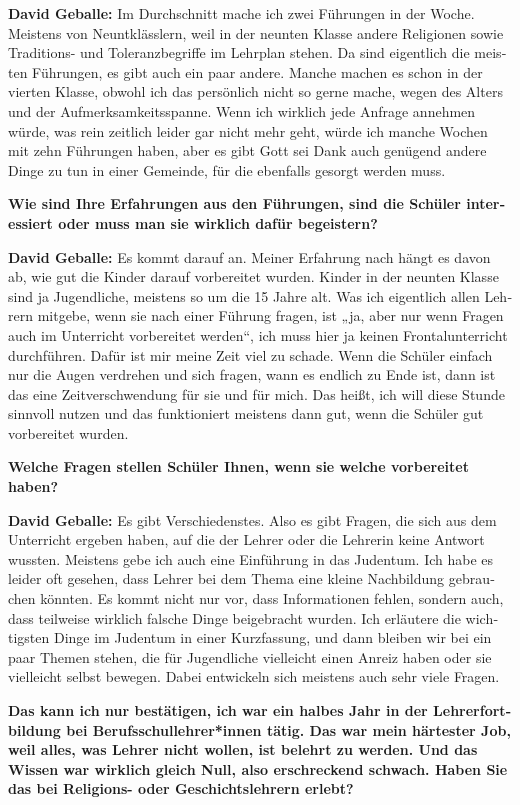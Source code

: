\begin{otherlanguage}{ngerman}
\textbf{David Geballe:} Im Durchschnitt mache ich zwei Führungen in der Woche. Meistens von Neuntklässlern, weil in der neunten Klasse andere Religionen sowie Traditions- und Toleranzbegriffe im Lehrplan stehen. Da sind eigentlich die meisten Führungen, es gibt auch ein paar andere. Manche machen es schon in der vierten Klasse, obwohl ich das persönlich nicht so gerne mache, wegen des Alters und der Aufmerksamkeitsspanne. Wenn ich wirklich jede Anfrage annehmen würde, was rein zeitlich leider gar nicht mehr geht, würde ich manche Wochen mit zehn Führungen haben, aber es gibt Gott sei Dank auch genügend andere Dinge zu tun in einer Gemeinde, für die ebenfalls gesorgt werden muss. 

\textbf{Wie sind Ihre Erfahrungen aus den Führungen, sind die Schüler interessiert oder muss man sie wirklich dafür begeistern?} 

\textbf{David Geballe:} Es kommt darauf an. Meiner Erfahrung nach hängt es davon ab, wie gut die Kinder darauf vorbereitet wurden. Kinder in der neunten Klasse sind ja Jugendliche, meistens so um die 15 Jahre alt. Was ich eigentlich allen Lehrern mitgebe, wenn sie nach einer Führung fragen, ist „ja, aber nur wenn Fragen auch im Unterricht vorbereitet werden“, ich muss hier ja keinen Frontalunterricht durchführen. Dafür ist mir meine Zeit viel zu schade. Wenn die Schüler einfach nur die Augen verdrehen und sich fragen, wann es endlich zu Ende ist, dann ist das eine Zeitverschwendung für sie und für mich. Das heißt, ich will diese Stunde sinnvoll nutzen und das funktioniert meistens dann gut, wenn die Schüler gut vorbereitet wurden. 

\textbf{Welche Fragen stellen Schüler Ihnen, wenn sie welche vorbereitet haben?} 

\textbf{David Geballe:} Es gibt Verschiedenstes. Also es gibt Fragen, die sich aus dem Unterricht ergeben haben, auf die der Lehrer oder die Lehrerin keine Antwort wussten. Meistens gebe ich auch eine Einführung in das Judentum. Ich habe es leider oft gesehen, dass Lehrer bei dem Thema eine kleine Nachbildung gebrauchen könnten. Es kommt nicht nur vor, dass Informationen fehlen, sondern auch, dass teilweise wirklich falsche Dinge beigebracht wurden. Ich erläutere die wichtigsten Dinge im Judentum in einer Kurzfassung, und dann bleiben wir bei ein paar Themen stehen, die für Jugendliche vielleicht einen Anreiz haben oder sie vielleicht selbst bewegen. Dabei entwickeln sich meistens auch sehr viele Fragen. 

\textbf{Das kann ich nur bestätigen, ich war ein halbes Jahr in der Lehrerfortbildung bei Berufsschullehrer*innen tätig. Das war mein härtester Job, weil alles, was Lehrer nicht wollen, ist belehrt zu werden. Und das Wissen war wirklich gleich Null, also erschreckend schwach. Haben Sie das bei Religions- oder Geschichtslehrern erlebt?} 


\end{otherlanguage}
